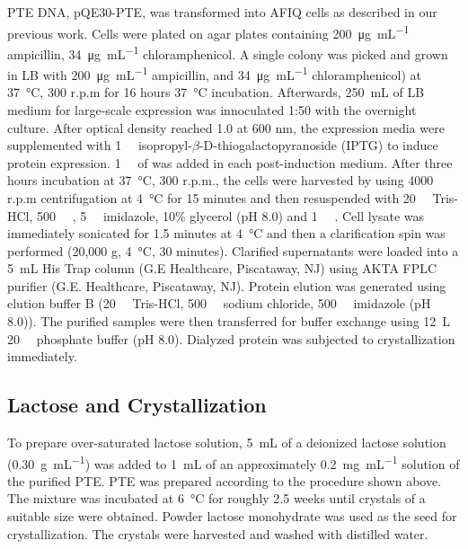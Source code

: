 \begin{refsection}
PTE DNA, pQE30-PTE, was transformed into AFIQ cells as described in our previous
work\cite{Yang2014a}. Cells were plated on agar plates containing
\SI{200}{\ug\per\mL} ampicillin, \SI{34}{\ug\per\mL} chloramphenicol. A single
colony was picked and grown in LB with \SI{200}{\ug\per\mL} ampicillin, and
\SI{34}{\ug\per\mL} chloramphenicol) at \SI{37}{\celsius}, 300 r.p.m for 16
hours \SI{37}{\celsius} incubation.  Afterwards, \SI{250}{\mL} of LB medium for
large-scale expression was innoculated 1:50 with the overnight culture.  After
optical density reached 1.0 at 600 nm, the expression media were supplemented
with \SI{1}{\milli\Molar} isopropyl-$\beta$-D-thiogalactopyranoside (IPTG) to
induce protein expression.  \SI{1}{\milli\Molar} of  was added in
each post-induction medium.  After three hours incubation at \SI{37}{\celsius},
300 r.p.m., the cells were harvested by using 4000 r.p.m centrifugation at
\SI{4}{\celsius} for 15 minutes and then resuspended with \SI{20}{\milli\Molar}
Tris-HCl, \SI{500}{\milli\Molar} , \SI{5}{\milli\Molar} imidazole,
10\% glycerol (pH 8.0) and \SI{1}{\micro\Molar} . Cell lysate was
immediately sonicated for 1.5 minutes at \SI{4}{\celsius} and then a
clarification spin was performed (20,000 g, \SI{4}{\celsius}, 30 minutes).
Clarified supernatants were loaded into a \SI{5}{\mL} His Trap column (G.E
Healthcare, Piscataway, NJ) using AKTA FPLC purifier (G.E.  Healthcare,
Piscataway, NJ).  Protein elution was generated using elution buffer B
(\SI{20}{\milli\Molar} Tris-HCl, \SI{500}{\milli\Molar} sodium chloride,
\SI{500}{\milli\Molar} imidazole (pH 8.0)).  The purified samples were then
transferred for buffer exchange using \SI{12}{\L} \SI{20}{\milli\Molar}
phosphate buffer (pH 8.0).  Dialyzed protein was subjected to crystallization
immediately.

\subsection{Lactose and Crystallization}

To prepare over-saturated lactose solution, \SI{5}{\mL} of a deionized lactose
solution (\SI{0.30}{\gram\per\mL}) was added to \SI{1}{\mL} of an approximately
\SI{0.2}{\mg\per\mL} solution of the purified PTE. PTE was prepared according
to the procedure shown above. The mixture was incubated at \SI{6}{\celsius} for
roughly 2.5 weeks until crystals of a suitable size were obtained. Powder
lactose monohydrate was used as the seed for crystallization.  The crystals
were harvested and washed with distilled water.


\end{refsection}
